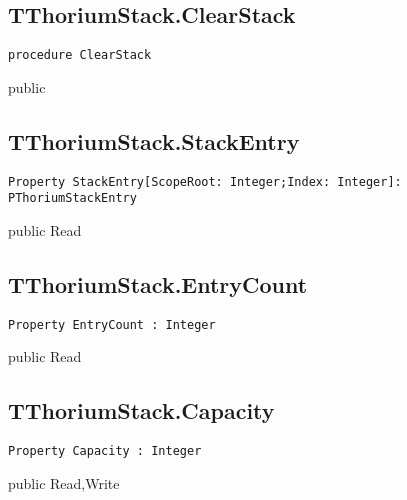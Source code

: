 \subsection{TThoriumStack.ClearStack}
\label{thoriumcore:thorium:tthoriumstack:clearstack}
\begin{FPCList}
\Synopsis
\Declaration 

\begin{verbatim}
procedure ClearStack
\end{verbatim}
\Visibility
public
\Description
\Errors
\end{FPCList}
\subsection{TThoriumStack.StackEntry}
\label{thoriumcore:thorium:tthoriumstack:stackentry}
\begin{FPCList}
\Synopsis
\Declaration 

\begin{verbatim}
Property StackEntry[ScopeRoot: Integer;Index: Integer]: PThoriumStackEntry
\end{verbatim}
\Visibility
public
\Access
Read
\Description
\end{FPCList}
\subsection{TThoriumStack.EntryCount}
\label{thoriumcore:thorium:tthoriumstack:entrycount}
\begin{FPCList}
\Synopsis
\Declaration 

\begin{verbatim}
Property EntryCount : Integer
\end{verbatim}
\Visibility
public
\Access
Read
\Description
\end{FPCList}
\subsection{TThoriumStack.Capacity}
\label{thoriumcore:thorium:tthoriumstack:capacity}
\begin{FPCList}
\Synopsis
\Declaration 

\begin{verbatim}
Property Capacity : Integer
\end{verbatim}
\Visibility
public
\Access
Read,Write
\Description
\end{FPCList}
